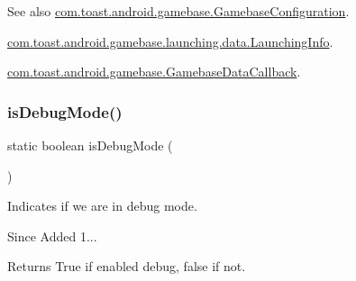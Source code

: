 \begin{DoxySeeAlso}{See also}
\hyperlink{classcom_1_1toast_1_1android_1_1gamebase_1_1_gamebase_configuration}{com.\+toast.\+android.\+gamebase.\+Gamebase\+Configuration}. 

\hyperlink{classcom_1_1toast_1_1android_1_1gamebase_1_1launching_1_1data_1_1_launching_info}{com.\+toast.\+android.\+gamebase.\+launching.\+data.\+Launching\+Info}. 

\hyperlink{interfacecom_1_1toast_1_1android_1_1gamebase_1_1_gamebase_data_callback}{com.\+toast.\+android.\+gamebase.\+Gamebase\+Data\+Callback}. 
\end{DoxySeeAlso}
\mbox{\label{classcom_1_1toast_1_1android_1_1gamebase_1_1_gamebase_ac53b9593245b674244afe37606ec15c6}} 
\subsubsection{\texorpdfstring{is\+Debug\+Mode()}{isDebugMode()}}
{\footnotesize\ttfamily static boolean is\+Debug\+Mode (\begin{DoxyParamCaption}{ }\end{DoxyParamCaption})\hspace{0.3cm}{\ttfamily [static]}}



Indicates if we are in debug mode. 

\begin{DoxySince}{Since}
Added 1... 
\end{DoxySince}
\begin{DoxyReturn}{Returns}
True if enabled debug, false if not. 
\end{DoxyReturn}
\mbox{\label{classcom_1_1toast_1_1android_1_1gamebase_1_1_gamebase_a40e7b7b4c19a8bf4140aa22033ab6489}} 
